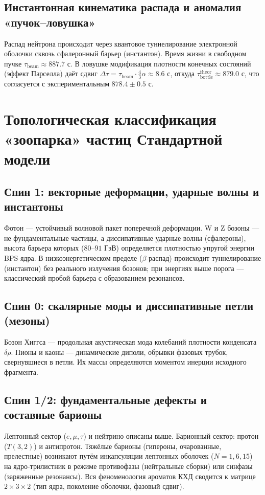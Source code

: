 \documentclass[11pt,a4paper]{article}
\begin{document}
	\subsection{Инстантонная кинематика распада и аномалия «пучок–ловушка»}
	Распад нейтрона происходит через квантовое туннелирование электронной оболочки сквозь сфалеронный барьер (инстантон). Время жизни в свободном пучке $\tau_{\text{beam}}\approx887.7$ с. В ловушке модификация плотности конечных состояний (эффект Парселла) даёт сдвиг $\Delta\tau = \tau_{\text{beam}}\cdot\frac{4}{3}\alpha \approx 8.6$ с, откуда $\tau_{\text{bottle}}^{\text{theor}}\approx879.0$ с, что согласуется с экспериментальным $878.4\pm0.5$ с.
	
	\section{Топологическая классификация «зоопарка» частиц Стандартной модели}
	
	\subsection{Спин 1: векторные деформации, ударные волны и инстантоны}
	Фотон — устойчивый волновой пакет поперечной деформации. W и Z бозоны — не фундаментальные частицы, а диссипативные ударные волны (сфалероны), высота барьера которых ($80$–$91$ ГэВ) определяется плотностью упругой энергии BPS-ядра. В низкоэнергетическом пределе ($\beta$-распад) происходит туннелирование (инстантон) без реального излучения бозонов; при энергиях выше порога — классический пробой барьера с образованием резонансов.
	
	\subsection{Спин 0: скалярные моды и диссипативные петли (мезоны)}
	Бозон Хиггса — продольная акустическая мода колебаний плотности конденсата $\delta\rho$. Пионы и каоны — динамические диполи, обрывки фазовых трубок, свернувшиеся в петли. Их массы определяются моментом инерции исходного фрагмента.
	
	\subsection{Спин 1/2: фундаментальные дефекты и составные барионы}
	Лептонный сектор ($e,\mu,\tau$) и нейтрино описаны выше. Барионный сектор: протон ($T(3,2)$) и антипротон. Тяжёлые барионы (гипероны, очарованные, прелестные) возникают путём инкапсуляции лептонных оболочек ($N=1,6,15$) на ядро-трилистник в режиме противофазы (нейтральные сборки) или синфазы (заряженные резонансы). Вся феноменология ароматов КХД сводится к матрице $2\times3\times2$ (тип ядра, поколение оболочки, фазовый сдвиг).
	
\end{document}
